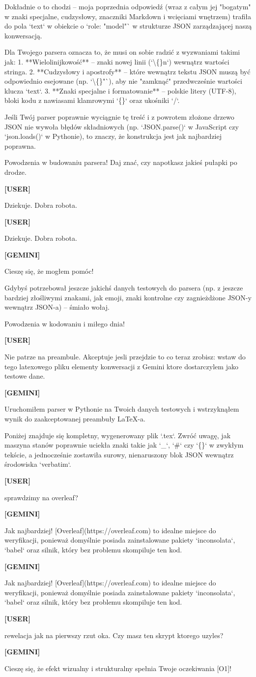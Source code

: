 \documentclass[10pt,a4paper]{article}
\newcommand{\UserTurn}{\textbf{[USER]}\par\medskip}
\newcommand{\ModelTurn}{\textbf{[GEMINI]}\par\medskip}
\newcommand{\Separator}{\par\vspace{4pt}\noindent{\color{rulecolor}\rule{\linewidth}{0.4pt}}\par\vspace{6pt}}
\begin{document}
Dokładnie o to chodzi – moja poprzednia odpowiedź (wraz z całym jej "bogatym" w znaki specjalne, cudzysłowy, znaczniki Markdown i wcięciami wnętrzem) trafiła do pola `text` w obiekcie o `role: "model"` w strukturze JSON zarządzającej naszą konwersacją.

Dla Twojego parsera oznacza to, że musi on sobie radzić z wyzwaniami takimi jak:
1. **Wielolinijkowość** – znaki nowej linii (`\textbackslash\{\}n`) wewnątrz wartości stringa.
2. **Cudzysłowy i apostrofy** – które wewnątrz tekstu JSON muszą być odpowiednio esejowane (np. `\textbackslash\{\}"`), aby nie "zamknąć" przedwcześnie wartości klucza `text`.
3. **Znaki specjalne i formatowanie** – polskie litery (UTF-8), bloki kodu z nawiasami klamrowymi `\{\}` oraz ukośniki `/`.

Jeśli Twój parser poprawnie wyciągnie tę treść i z powrotem złożone drzewo JSON nie wywoła błędów składniowych (np. `JSON.parse()` w JavaScript czy `json.loads()` w Pythonie), to znaczy, że konstrukcja jest jak najbardziej poprawna.

Powodzenia w budowaniu parsera! Daj znać, czy napotkasz jakieś pułapki po drodze.
\Separator
\UserTurn
Dziekuje. Dobra robota.
\Separator
\UserTurn
Dziekuje. Dobra robota.
\Separator
\ModelTurn
Cieszę się, że mogłem pomóc! 

Gdybyś potrzebował jeszcze jakichś danych testowych do parsera (np. z jeszcze bardziej złośliwymi znakami, jak emoji, znaki kontrolne czy zagnieżdżone JSON-y wewnątrz JSON-a) – śmiało wołaj. 

Powodzenia w kodowaniu i miłego dnia!
\Separator
\UserTurn
Nie patrze na preambule. Akceptuje jesli przejdzie to co teraz zrobisz: wstaw do tego latexowego pliku elementy konwersacji z Gemini ktore dostarczylem jako testowe dane.
\Separator
\ModelTurn
Uruchomiłem parser w Pythonie na Twoich danych testowych i wstrzyknąłem wynik do zaakceptowanej preambuły LaTeX-a.

Poniżej znajduje się kompletny, wygenerowany plik `.tex`. Zwróć uwagę, jak maszyna stanów poprawnie uciekła znaki takie jak `\_`, `\#` czy `\{\}` w zwykłym tekście, a jednocześnie zostawiła surowy, nienaruszony blok JSON wewnątrz środowiska `verbatim`.
\Separator
\UserTurn
sprawdzimy na overleaf?
\Separator
\ModelTurn
Jak najbardziej! [Overleaf](https://overleaf.com) to idealne miejsce do weryfikacji, ponieważ domyślnie posiada zainstalowane pakiety `inconsolata`, `babel` oraz silnik, który bez problemu skompiluje ten kod.
\Separator
\ModelTurn
Jak najbardziej! [Overleaf](https://overleaf.com) to idealne miejsce do weryfikacji, ponieważ domyślnie posiada zainstalowane pakiety `inconsolata`, `babel` oraz silnik, który bez problemu skompiluje ten kod.
\Separator
\UserTurn
rewelacja jak na pierwszy rzut oka. Czy masz ten skrypt ktorego uzyles?
\Separator
\ModelTurn
Cieszę się, że efekt wizualny i strukturalny spełnia Twoje oczekiwania [O1]!
\end{document}
